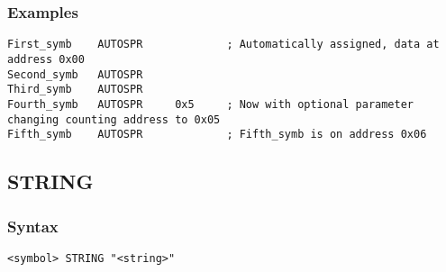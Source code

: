     \subsubsection{Examples}
        \verb'First_symb    AUTOSPR             ; Automatically assigned, data at address 0x00'\\
        \verb'Second_symb   AUTOSPR'\\
        \verb'Third_symb    AUTOSPR'\\
        \verb'Fourth_symb   AUTOSPR     0x5     ; Now with optional parameter changing counting address to 0x05'\\
        \verb'Fifth_symb    AUTOSPR             ; Fifth_symb is on address 0x06'
%
%
%
%

    \subsection{STRING}
        \subsubsection{Syntax}
            \verb'<symbol> STRING "<string>"'

